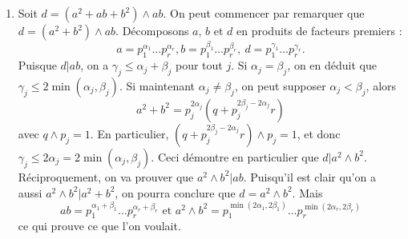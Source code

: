 \documentclass[11pt,a4paper]{article}
\begin{document}
\begin{corrige}
\begin{enumerate}
			\item  Soit $d=(a^2+ab+b^2)\wedge ab$. On peut commencer par remarquer que 
			$d=(a^2+b^2)\wedge ab$. Décomposons $a$, $b$ et $d$ en produits de facteurs premiers :
			$$a=p_1^{\alpha_1}\dots p_r^{\alpha_r}, b=p_1^{\beta_1}\dots p_r^{\beta_r},\ d=p_1^{\gamma_1}\dots p_r^{\gamma_r}.$$
			Puisque $d|ab$, on a $\gamma_j\leq \alpha_j+\beta_j$ pour tout $j$. 
			Si $\alpha_j=\beta_j$, on en déduit que $\gamma_j\leq 2\min(\alpha_j,\beta_j)$. 
			Si maintenant $\alpha_j\neq \beta_j$, on peut supposer $\alpha_j<\beta_j$, alors 
			$$a^2+b^2=p_j^{2\alpha_j}(q+p_j^{2\beta_j-2\alpha_j}r)$$
			avec $q\wedge p_j=1$. En particulier, $(q+p_j^{2\beta_j-2\alpha_j}r)\wedge p_j=1$, et donc 
			$\gamma_j\leq 2\alpha_j=2\min(\alpha_j,\beta_j)$. Ceci démontre en particulier que $d|a^2\wedge b^2$.
			Réciproquement, on va prouver que $a^2\wedge b^2|ab$. Puisqu'il est clair qu'on a aussi $a^2\wedge b^2|a^2+b^2$,
			on pourra conclure que $d=a^2\wedge b^2.$ Mais 
			$$ab=p_1^{\alpha_1+\beta_1}\dots p_r^{\alpha_r+\beta_r}\textrm{ et }a^2\wedge b^2=p_1^{\min(2\alpha_1,2\beta_1)}\dots p_r^{\min(2\alpha_r,2\beta_r)}$$
			ce qui prouve ce que l'on voulait.
			
		\end{enumerate}
	\end{corrige}
	
\end{document}
